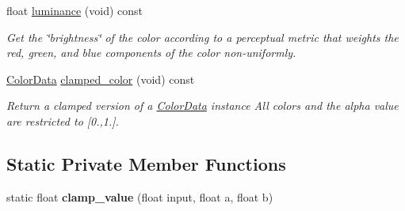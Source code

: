 \begin{DoxyCompactItemize}
\item 
float \hyperlink{classimage__tools_1_1ColorData_a9bea35824e209d2c216739fdc8b9bf3f}{luminance} (void) const \hypertarget{classimage__tools_1_1ColorData_a9bea35824e209d2c216739fdc8b9bf3f}{}\label{classimage__tools_1_1ColorData_a9bea35824e209d2c216739fdc8b9bf3f}

\begin{DoxyCompactList}\small\item\em Get the \char`\"{}brightness\char`\"{} of the color according to a perceptual metric that weights the red, green, and blue components of the color non-\/uniformly. \end{DoxyCompactList}\item 
\hyperlink{classimage__tools_1_1ColorData}{Color\+Data} \hyperlink{classimage__tools_1_1ColorData_add7ac66b4e579f06f59f03c2206a0429}{clamped\+\_\+color} (void) const \hypertarget{classimage__tools_1_1ColorData_add7ac66b4e579f06f59f03c2206a0429}{}\label{classimage__tools_1_1ColorData_add7ac66b4e579f06f59f03c2206a0429}

\begin{DoxyCompactList}\small\item\em Return a clamped version of a \hyperlink{classimage__tools_1_1ColorData}{Color\+Data} instance All colors and the alpha value are restricted to \mbox{[}0.,1.\mbox{]}. \end{DoxyCompactList}\end{DoxyCompactItemize}
\subsection*{Static Private Member Functions}
\begin{DoxyCompactItemize}
\item 
static float {\bfseries clamp\+\_\+value} (float input, float a, float b)\hypertarget{classimage__tools_1_1ColorData_ac9c19726be7a97e13b6916ed26822740}{}\label{classimage__tools_1_1ColorData_ac9c19726be7a97e13b6916ed26822740}

\end{DoxyCompactItemize}
